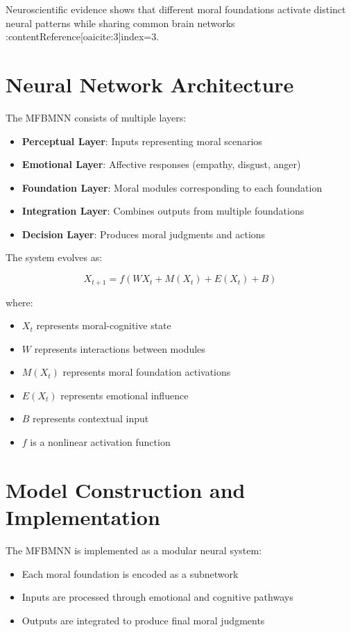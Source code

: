 \documentclass[12pt]{article}
\begin{document}
Neuroscientific evidence shows that different moral foundations activate distinct neural patterns while sharing common brain networks :contentReference[oaicite:3]{index=3}.

\section{Neural Network Architecture}

The MFBMNN consists of multiple layers:

\begin{itemize}
\item \textbf{Perceptual Layer}: Inputs representing moral scenarios
\item \textbf{Emotional Layer}: Affective responses (empathy, disgust, anger)
\item \textbf{Foundation Layer}: Moral modules corresponding to each foundation
\item \textbf{Integration Layer}: Combines outputs from multiple foundations
\item \textbf{Decision Layer}: Produces moral judgments and actions
\end{itemize}

The system evolves as:

\[
X_{t+1} = f(WX_t + M(X_t) + E(X_t) + B)
\]

where:
\begin{itemize}
\item $X_t$ represents moral-cognitive state
\item $W$ represents interactions between modules
\item $M(X_t)$ represents moral foundation activations
\item $E(X_t)$ represents emotional influence
\item $B$ represents contextual input
\item $f$ is a nonlinear activation function
\end{itemize}

\section{Model Construction and Implementation}

The MFBMNN is implemented as a modular neural system:

\begin{itemize}
\item Each moral foundation is encoded as a subnetwork
\item Inputs are processed through emotional and cognitive pathways
\item Outputs are integrated to produce final moral judgments
\end{itemize}
\end{document}
